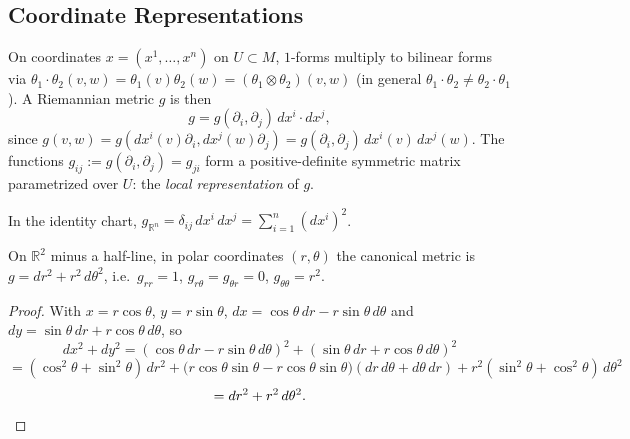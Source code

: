 \subsection{Coordinate Representations}

\begin{definition}
  \label{def:pet-ch1-coordinate-metric}
  \leanok
  On coordinates $x=(x^1,\dots,x^n)$ on $U\subset M$, $1$-forms multiply to
  bilinear forms via $\theta_1\cdot\theta_2(v,w)=\theta_1(v)\theta_2(w)=
  (\theta_1\otimes\theta_2)(v,w)$ (in general $\theta_1\cdot\theta_2\ne
  \theta_2\cdot\theta_1$). A Riemannian metric $g$ is then
  \[
    g=g(\partial_i,\partial_j)\,dx^i\cdot dx^j,
  \]
  since $g(v,w)=g(dx^i(v)\partial_i,dx^j(w)\partial_j)=g(\partial_i,\partial_j)\,
  dx^i(v)\,dx^j(w)$. The functions $g_{ij}:=g(\partial_i,\partial_j)=g_{ji}$ form a
  positive-definite symmetric matrix parametrized over $U$: the \emph{local
  representation} of $g$.
\end{definition}

\begin{example}
  \label{ex:pet-ch1-euclidean-coords}
  \leanok
  In the identity chart, $g_{\mathbb{R}^n}=\delta_{ij}\,dx^i\,dx^j=\sum_{i=1}^n(dx^i)^2$.
\end{example}

\begin{example}
  \label{ex:pet-ch1-polar-coords}
  \leanok
  On $\mathbb{R}^2$ minus a half-line, in polar coordinates $(r,\theta)$ the canonical
  metric is $g=dr^2+r^2\,d\theta^2$, i.e.\ $g_{rr}=1$, $g_{r\theta}=g_{\theta r}=0$,
  $g_{\theta\theta}=r^2$.
\end{example}
\begin{proof}
  \leanok
  With $x=r\cos\theta$, $y=r\sin\theta$, $dx=\cos\theta\,dr-r\sin\theta\,d\theta$
  and $dy=\sin\theta\,dr+r\cos\theta\,d\theta$, so
  \[
    dx^2+dy^2=(\cos\theta\,dr-r\sin\theta\,d\theta)^2+(\sin\theta\,dr+r\cos\theta\,d\theta)^2
  \]
  \[
    =(\cos^2\theta+\sin^2\theta)\,dr^2
    +\big(r\cos\theta\sin\theta-r\cos\theta\sin\theta\big)(dr\,d\theta+d\theta\,dr)
    +r^2(\sin^2\theta+\cos^2\theta)\,d\theta^2
  \]
  \[
    =dr^2+r^2\,d\theta^2.\qedhere
  \]
\end{proof}

